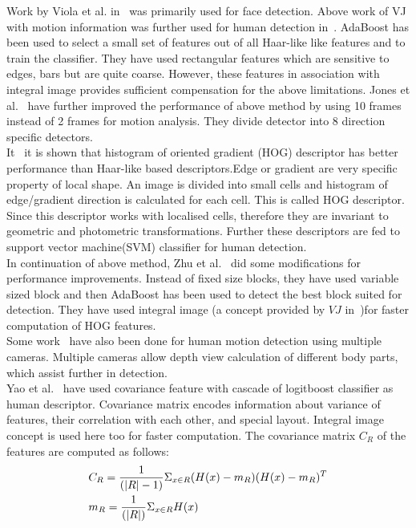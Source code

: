 \indent Work by Viola et al. in~\cite{17} was primarily used for
face detection.  Above work of VJ with motion information was further
used for human detection in~\cite{16}.  AdaBoost has been used to
select a small set of features out of all Haar-like like features and to
train the classifier. They have used rectangular features which are
sensitive to edges, bars but are quite coarse. However, these features
in association with integral image provides sufficient compensation for
the above limitations. Jones et al.~\cite{26} have further improved
the performance of above method by using 10 frames instead of 2 frames
for motion analysis. They divide detector into 8 direction specific
detectors.\\
\indent It~\cite{20, 21} it is shown that histogram of oriented
gradient (HOG) descriptor has better performance than Haar-like based
descriptors.Edge or gradient are very specific property of local shape.
An image is divided into small cells and histogram of edge/gradient
direction is calculated for each cell. This is called HOG descriptor.
Since this descriptor works with localised cells, therefore they are
invariant to geometric and photometric transformations. Further these
descriptors are fed to support vector machine(SVM) classifier for human
detection.\\
\indent In continuation of above method, Zhu et al.~\cite{20} did some
modifications for performance improvements. Instead of fixed size
blocks, they have used variable sized block and then AdaBoost has been
used to detect the best block suited for detection. They have used
integral image (a concept provided by $VJ$ in~\cite{17})for faster
computation of HOG features.\\
\indent Some work~\cite{30} have also been done for human motion
detection using multiple cameras. Multiple cameras allow depth view
calculation of different body parts, which assist further in
detection.\\
\indent Yao et al.~\cite{25} have used covariance feature with cascade of
logitboost classifier as human descriptor. Covariance matrix
encodes information about variance of features, their correlation with
each other, and special layout. Integral image concept is used here too
for faster computation. The covariance matrix $C_R$ of the features are
computed as follows:
\begin{equation}
\begin{aligned}
& C_R = {1 \over {(|R| - 1)}} \Sigma _{x \in R} (H(x) - m_R) (H(x) - m_R)^T\\
& m_R = {1 \over {(|R|)}} \Sigma _{x \in R} H(x)
\end{aligned}
\end{equation}

